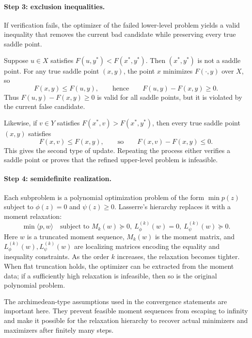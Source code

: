 \documentclass[11pt]{article}
\begin{document}
\paragraph{Step 3: exclusion inequalities.}
If verification fails, the optimizer of the failed lower-level problem yields a valid inequality
that removes the current bad candidate while preserving every true saddle point.

Suppose $u \in X$ satisfies $F(u,y^\ast)<F(x^\ast,y^\ast)$. Then $(x^\ast,y^\ast)$ is not a saddle point.
For any true saddle point $(x,y)$, the point $x$ minimizes $F(\cdot,y)$ over $X$, so
\[
F(x,y)\leq F(u,y),
\qquad\text{hence}\qquad
F(u,y)-F(x,y)\geq 0.
\]
Thus $F(u,y)-F(x,y)\ge 0$ is valid for all saddle points, but it is violated by the current false
candidate.

Likewise, if $v \in Y$ satisfies $F(x^\ast,v)>F(x^\ast,y^\ast)$, then every true saddle point $(x,y)$
satisfies
\[
F(x,v)\leq F(x,y),
\qquad\text{so}\qquad
F(x,v)-F(x,y)\leq 0.
\]
This gives the second type of update. Repeating the process either verifies a saddle point or
proves that the refined upper-level problem is infeasible.

\paragraph{Step 4: semidefinite realization.}
Each subproblem is a polynomial optimization problem of the form $\min p(z)$ subject to
$\phi(z)=0$ and $\psi(z)\ge 0$. Lasserre's hierarchy replaces it with a moment relaxation:
\[
\min \langle p,w\rangle
\quad
\text{subject to } M_k(w)\succeq 0,\ L_{\phi}^{(k)}(w)=0,\ L_{\psi}^{(k)}(w)\succeq 0.
\]
Here $w$ is a truncated moment sequence, $M_k(w)$ is the moment matrix, and
$L_{\phi}^{(k)}(w),L_{\psi}^{(k)}(w)$ are localizing matrices encoding the equality and inequality
constraints. As the order $k$ increases, the relaxation becomes tighter. When flat truncation
holds, the optimizer can be extracted from the moment data; if a sufficiently high relaxation is
infeasible, then so is the original polynomial problem.

The archimedean-type assumptions used in the convergence statements are important here. They
prevent feasible moment sequences from escaping to infinity and make it possible for the relaxation hierarchy to recover
actual minimizers and maximizers after finitely many steps.
\end{document}
